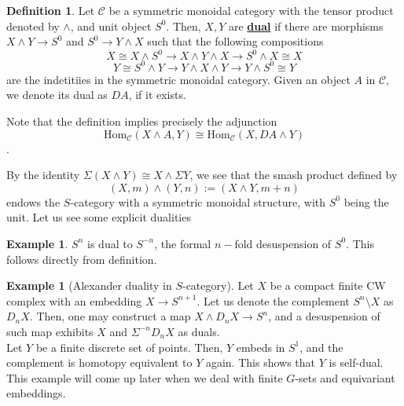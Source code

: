 \documentclass{article}
\theoremstyle{definition}
\newtheorem{definition}[theorem]{Definition}
\newtheorem{example}[theorem]{Example}
\begin{document}
\begin{tcolorbox}[colback=purple!5!white,colframe=purple!75!black]
\begin{definition}
Let $\mathcal{C}$ be a symmetric monoidal category with the tensor product denoted by $\wedge$, and unit object $S^0$. Then, $X,Y$ are \underline{\textbf{dual}} if there are morphisms $X\wedge Y\to S^0$ and $S^0\to Y\wedge X$ such that the following compositions
\[X\cong X\wedge S^0\to X\wedge Y\wedge X\to S^0\wedge X\cong X\]
\[Y\cong S^0\wedge Y\to Y\wedge X\wedge Y\to Y\wedge S^0\cong Y\]
are the indetitiies in the symmetric monoidal category. Given an object $A$ in $\mathcal{C},$ we denote its dual as $DA$, if it exists.
\end{definition}
\end{tcolorbox}
Note that the definition implies precisely the adjunction 
\[\textrm{Hom}_{\mathcal{C}}(X\wedge A, Y)\cong \textrm{Hom}_{\mathcal{C}}(X, DA\wedge Y)\]. 



By the identity $\Sigma(X\wedge Y)\cong X\wedge \Sigma Y$, we see that the smash product defined by 
\[(X,m)\wedge (Y,n):=(X\wedge Y,m+n)\]
endows the $S$-category with a symmetric monoidal structure, with $S^0$ being the unit. Let us see some explicit dualities

\begin{tcolorbox}[colback=yellow!5!white,colframe=yellow!30!white]
\begin{example}
    $S^n$ is dual to $S^{-n}$, the formal $n-$fold desuspension of $S^0$. This follows directly from definition.
\end{example}
\end{tcolorbox}

\begin{tcolorbox}[colback=yellow!5!white,colframe=yellow!30!white]
    \begin{example}[Alexander duality in $S$-category]
   Let $X$ be a compact finite CW complex with an embedding $X\to S^{n+1}$. Let us denote the complement $S^n\setminus X$ as $D_nX$. Then, one may construct a map $X\wedge D_nX\to S^n$, and a desuspension of such map exhibits $X$ and $\Sigma^{-n}D_nX$ as duals. \\

   Let $Y$ be a finite discrete set of points. Then, $Y$ embeds in $S^1$, and the complement is homotopy equivalent to $Y$ again. This shows that $Y$ is self-dual. This example will come up later when we deal with finite $G$-sets and equivariant embeddings. 
    \end{example}
    \end{tcolorbox}
\end{document}
